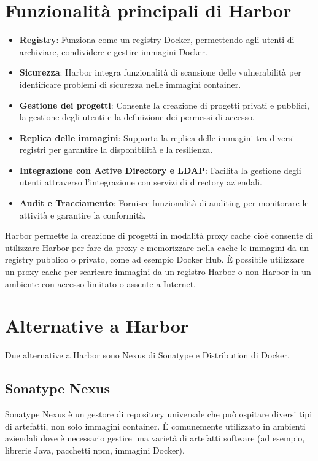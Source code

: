 \documentclass[12pt]{report}
\begin{document}
\section{Funzionalità principali di Harbor}
\begin{itemize}
    \item \textbf{Registry}: Funziona come un registry Docker, permettendo agli utenti di archiviare, condividere e gestire immagini Docker.
    \item \textbf{Sicurezza}: Harbor integra funzionalità di scansione delle vulnerabilità per identificare problemi di sicurezza nelle immagini container.
    \item \textbf{Gestione dei progetti}: Consente la creazione di progetti privati e pubblici, la gestione degli utenti e la definizione dei permessi di accesso.
    \item \textbf{Replica delle immagini}: Supporta la replica delle immagini tra diversi registri per garantire la disponibilità e la resilienza.
    \item \textbf{Integrazione con Active Directory e LDAP}: Facilita la gestione degli utenti attraverso l'integrazione con servizi di directory aziendali.
    \item \textbf{Audit e Tracciamento}: Fornisce funzionalità di auditing per monitorare le attività e garantire la conformità.
\end{itemize}
Harbor permette la creazione di progetti in modalità proxy cache cioè consente di utilizzare Harbor per fare da proxy e memorizzare nella cache le immagini da un registry pubblico o privato, come ad esempio Docker Hub. È possibile utilizzare un proxy cache per scaricare immagini da un registro Harbor o non-Harbor in un ambiente con accesso limitato o assente a Internet.
\section{Alternative a Harbor}
Due alternative a Harbor sono Nexus di Sonatype e Distribution di Docker.
\subsection{Sonatype Nexus}
Sonatype Nexus è un gestore di repository universale che può ospitare diversi tipi di artefatti, non solo immagini container. È comunemente utilizzato in ambienti aziendali dove è necessario gestire una varietà di artefatti software (ad esempio, librerie Java, pacchetti npm, immagini Docker).
\end{document}

